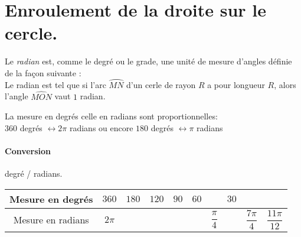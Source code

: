 \documentclass{article}
\begin{document}
\section{Enroulement de la droite sur le cercle.}
\noindent\begin{minipage}{\textwidth - 3.5cm}
\begin{Def}
   Le \emph{radian} est, comme le degré ou le grade, une unité de mesure d'angles définie de la façon suivante :\\
   Le radian est tel que si l'arc $\wideparen{MN}$ d'un cerle de rayon $R$ a pour longueur $R$, alors l'angle $\widehat{MON}$ vaut $1$ radian. \end{Def}

\begin{rem}
   La mesure en degrés celle en radians sont proportionnelles:\\ $360$ degrés $\leftrightarrow 2\pi$ radians ou encore $180$ degrés $\leftrightarrow \pi$ radians
\end{rem}
\paragraph{Conversion} degré / radians.
\end{minipage}
\hfill
\begin{minipage}{3cm}
\begin{center}
\end{center}
\end{minipage}



 \noindent \renewcommand{\arraystretch}{1.8}%
\begin{tabular}{|c|*9{c|}}
         \hline 
         Mesure en degrés & $360$ &$180$& $120$ & $90$ & $60$ &  & $30$ & &\\ 
         \hline 
         Mesure en radians & $2\pi$ &\phantom{$\sum_.^{1}$}  &  &  & &$\dfrac{\pi}{4}$ &  & $\dfrac{7\pi}{4}$& $\dfrac{11\pi}{12}$\\ 
         \hline 
      \end{tabular} 
\end{document}

